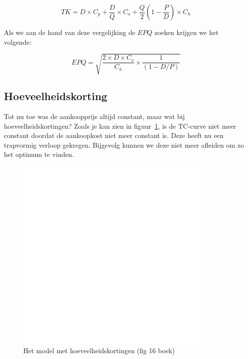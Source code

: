 \begin{equation}
    TK = D \times C_p + \frac{D}{Q} \times C_o + \frac{Q}{2} \left( 1 - \frac{P}{D} \right) \times C_h
\end{equation}

Als we aan de hand van deze vergelijking de $EPQ$ zoeken krijgen we het volgende:

\begin{equation}
    EPQ = \sqrt{\frac{2 \times D \times C_o}{C_h} \times \frac{1}{ ( 1 - D/P )} }
\end{equation}


\subsection{Hoeveelheidskorting}
Tot nu toe was de aankoopprijs altijd constant, maar wat bij hoeveelheidskortingen? Zoals je kan zien in figuur~\ref{fig:hoeveelheidskortingen}, is de TC-curve niet meer constant doordat de aankoopkost niet meer constant is. Deze heeft nu een trapvormig verloop gekregen. Bijgevolg kunnen we deze niet meer afleiden om zo het optimum te vinden.
\begin{figure}[htbp]
    \centering
    \includegraphics[scale=0.4]{Images/white.png}
    \caption{Het model met hoeveelheidskortingen (fig 16 boek)}
    \label{fig:hoeveelheidskortingen}
\end{figure}

